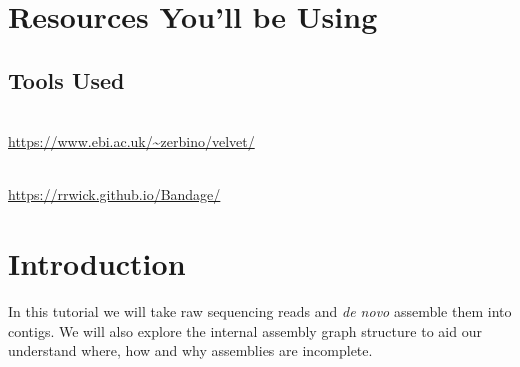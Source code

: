 \section{Resources You'll be Using}
 
\subsection{Tools Used}
\begin{description}[style=multiline,labelindent=0cm,align=left,leftmargin=0.5cm]
  \item[Velvet]\hfill\\
  	\url{https://www.ebi.ac.uk/~zerbino/velvet/}
  \item[Bandage]\hfill\\
  	\url{https://rrwick.github.io/Bandage/}
\end{description}

 

\newpage

\section{Introduction}

In this tutorial we will take raw sequencing reads and \textit{de novo} assemble them
into contigs. We will also explore the internal assembly graph structure to
aid our understand where, how and why assemblies are incomplete.

